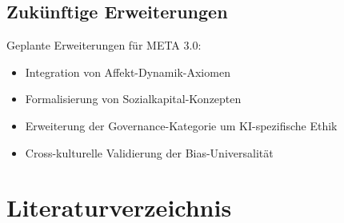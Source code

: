 \documentclass[11pt,a4paper]{article}
\theoremstyle{definition}
\theoremstyle{plain}
\newcommand{\META}{\textsc{META}}
\begin{document}
\subsection{Zukünftige Erweiterungen}

Geplante Erweiterungen für \META{} 3.0:
\begin{itemize}
    \item Integration von Affekt-Dynamik-Axiomen
    \item Formalisierung von Sozialkapital-Konzepten
    \item Erweiterung der Governance-Kategorie um KI-spezifische Ethik
    \item Cross-kulturelle Validierung der Bias-Universalität
\end{itemize}


\section*{Literaturverzeichnis}
\end{document}

